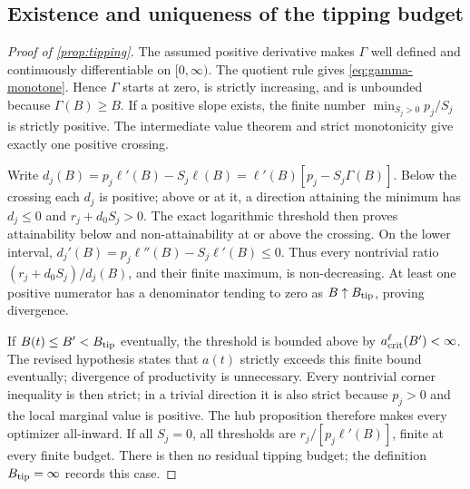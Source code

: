 \documentclass[11pt,a4paper]{article}
\theoremstyle{definition}\newtheorem{definition}{Definition}
\begin{document}
\subsection{Existence and uniqueness of the tipping budget}
\label{app:tipping-proof}
\begin{proof}[Proof of \cref{prop:tipping}]
The assumed positive derivative makes $\Gamma$ well defined and
continuously differentiable on $[0,\infty)$. The quotient rule gives
\cref{eq:gamma-monotone}. Hence $\Gamma$ starts at zero, is strictly
increasing, and is unbounded because $\Gamma(B)\geq B$.
If a positive slope exists, the finite number
$\min_{S_j>0}p_j/S_j$ is strictly positive. The intermediate value
theorem and strict monotonicity give exactly one positive crossing.

Write $d_j(B)=p_j\ell'(B)-S_j\ell(B)
=\ell'(B)[p_j-S_j\Gamma(B)]$.
Below the crossing each $d_j$ is positive; above or at it, a direction
attaining the minimum has $d_j\leq0$ and $r_j+d_0S_j>0$.
The exact logarithmic threshold then proves attainability below and
non-attainability at or above the crossing. On the lower interval,
$d_j'(B)=p_j\ell''(B)-S_j\ell'(B)\leq0$. Thus every nontrivial
ratio $(r_j+d_0S_j)/d_j(B)$, and their finite maximum, is
non-decreasing. At least one positive numerator has a denominator
tending to zero as $B\uparrow B_{\rm tip}$, proving divergence.

If $B(t)\leq B'<B_{\rm tip}$ eventually, the threshold is bounded
above by $a_{\rm crit}^{\ell}(B')<\infty$. The revised hypothesis
states that $a(t)$ strictly exceeds this finite bound eventually;
divergence of productivity is unnecessary. Every nontrivial corner inequality
is then strict; in a trivial direction it is also strict because
$p_j>0$ and the local marginal value is positive. The hub proposition
therefore makes every optimizer all-inward. If all $S_j=0$, all
thresholds are $r_j/[p_j\ell'(B)]$, finite at every finite budget.
There is then no residual tipping budget; the definition
$B_{\rm tip}=\infty$ records this case.
\end{proof}
\end{document}
